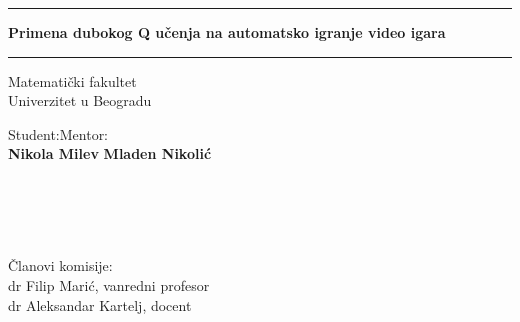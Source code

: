 \documentclass[12pt]{report}
\begin{document}
\begin{titlepage}
    \begin{center}
    
        \vspace*{1cm}
        \hrule
        \vspace*{1cm}
        \textbf{Primena dubokog Q učenja na automatsko igranje video igara}
        \vspace*{1cm}
        \hrule
        \vspace{1cm}
        
		
        \begin{center}
        	Matematički fakultet \\
        	Univerzitet u Beogradu
        \end{center}
        \vspace{1.5cm}
        Student:\hfill Mentor:\\
        \textbf{Nikola Milev}
		\hfill        
        \textbf{Mladen Nikolić} \\
         ~ \\ ~ \\ ~ \\ ~ \\
		\begin{flushleft}
		Članovi komisije:  \\
        dr Filip Marić, vanredni profesor  \\
        dr Aleksandar Kartelj, docent  \\
		\end{flushleft}		        
        

\end{center}
\end{titlepage}
\end{document}
